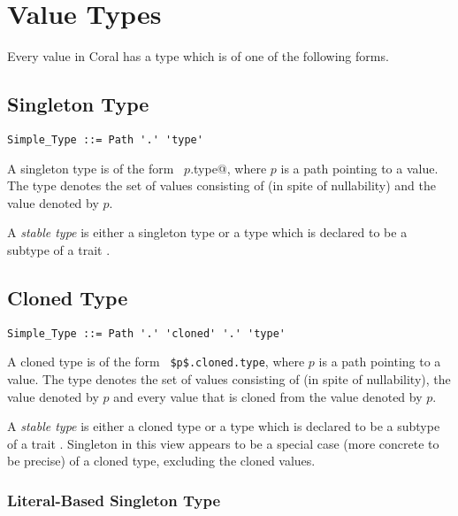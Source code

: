 \section{Value Types}

Every value in Coral has a type which is of one of the following forms. 






\subsection{Singleton Type}
\label{sec:singleton-types}

\syntax\begin{lstlisting}
Simple_Type ::= Path '.' 'type'
\end{lstlisting}

A singleton type is of the form ~\lstinline@$p$.type@, where $p$ is a path pointing to a value. The type denotes the set of values consisting of  (in spite of nullability) and the value denoted by $p$.

A {\em stable type} is either a singleton type or a type which is declared to be a subtype of a trait . 





\subsection{Cloned Type}
\label{sec:cloned-types}

\syntax\begin{lstlisting}
Simple_Type ::= Path '.' 'cloned' '.' 'type'
\end{lstlisting}

A cloned type is of the form ~\lstinline!$p$.cloned.type!, where $p$ is a path pointing to a value. The type denotes the set of values consisting of  (in spite of nullability), the value denoted by $p$ and every value that is cloned from the value denoted by $p$. 

A {\em stable type} is either a cloned type or a type which is declared to be a subtype of a trait . Singleton in this view appears to be a special case (more concrete to be precise) of a cloned type, excluding the cloned values. 





\subsubsection{Literal-Based Singleton Type}
\label{sec:literal-based-singleton-type}

